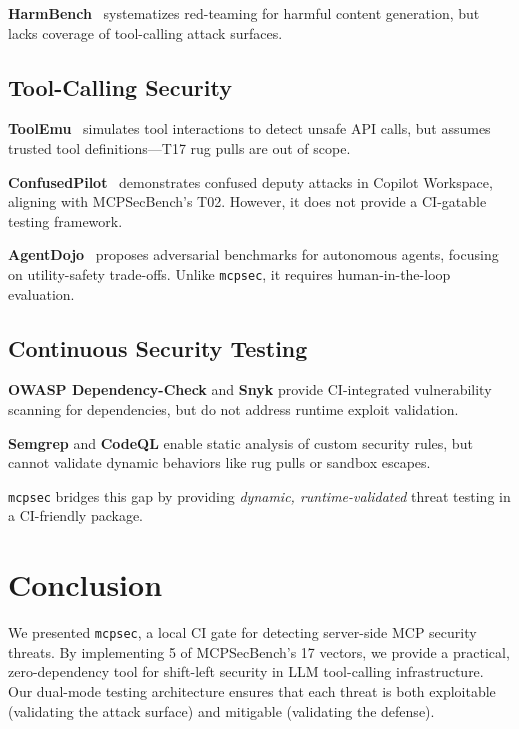 \documentclass[11pt]{article}
\begin{document}
\textbf{HarmBench}~\cite{mazeika2024harmbench} systematizes red-teaming for harmful content generation, but lacks coverage of tool-calling attack surfaces.

\subsection{Tool-Calling Security}

\textbf{ToolEmu}~\cite{ruan2023toolemu} simulates tool interactions to detect unsafe API calls, but assumes trusted tool definitions—T17 rug pulls are out of scope.

\textbf{ConfusedPilot}~\cite{zhang2024confused} demonstrates confused deputy attacks in Copilot Workspace, aligning with MCPSecBench's T02. However, it does not provide a CI-gatable testing framework.

\textbf{AgentDojo}~\cite{debenedetti2024agentdojo} proposes adversarial benchmarks for autonomous agents, focusing on utility-safety trade-offs. Unlike \texttt{mcpsec}, it requires human-in-the-loop evaluation.

\subsection{Continuous Security Testing}

\textbf{OWASP Dependency-Check} and \textbf{Snyk} provide CI-integrated vulnerability scanning for dependencies, but do not address runtime exploit validation.

\textbf{Semgrep} and \textbf{CodeQL} enable static analysis of custom security rules, but cannot validate dynamic behaviors like rug pulls or sandbox escapes.

\texttt{mcpsec} bridges this gap by providing \emph{dynamic, runtime-validated} threat testing in a CI-friendly package.

\section{Conclusion}
\label{sec:conclusion}

We presented \texttt{mcpsec}, a local CI gate for detecting server-side MCP security threats. By implementing 5 of MCPSecBench's 17 vectors, we provide a practical, zero-dependency tool for shift-left security in LLM tool-calling infrastructure. Our dual-mode testing architecture ensures that each threat is both exploitable (validating the attack surface) and mitigable (validating the defense).
\end{document}
